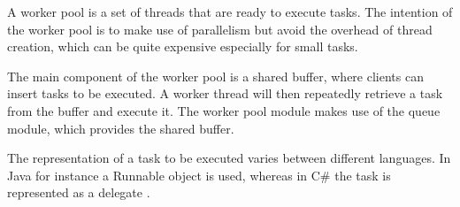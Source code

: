 % 
% 
% 
% 
% 
% 

A worker pool is a set of threads that are ready to execute tasks.
The intention of the worker pool is to make use of parallelism but avoid the overhead of thread creation, which can be quite expensive especially for small tasks.

The main component of the worker pool is a shared buffer, where clients can insert tasks to be executed.
A worker thread will then repeatedly retrieve a task from the buffer and execute it.
The worker pool module makes use of the queue module, which provides the shared buffer.


The representation of a task to be executed varies between different languages.
In Java for instance a Runnable  object is used, whereas in C\# the task is represented as a delegate .

